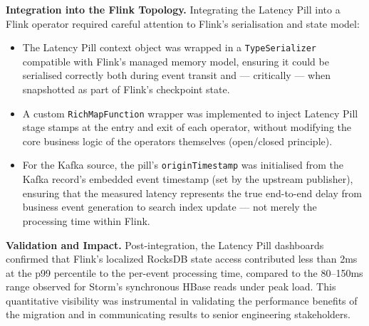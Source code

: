 \begin{justify}
    \textbf{Integration into the Flink Topology.} Integrating the Latency Pill into a Flink operator required careful attention to Flink's serialisation and state model:
    \begin{itemize}
        \item The Latency Pill context object was wrapped in a \texttt{TypeSerializer} compatible with Flink's managed memory model, ensuring it could be serialised correctly both during event transit and — critically — when snapshotted as part of Flink's checkpoint state.
        \item A custom \texttt{RichMapFunction} wrapper was implemented to inject Latency Pill stage stamps at the entry and exit of each operator, without modifying the core business logic of the operators themselves (open/closed principle).
        \item For the Kafka source, the pill's \texttt{originTimestamp} was initialised from the Kafka record's embedded event timestamp (set by the upstream publisher), ensuring that the measured latency represents the true end-to-end delay from business event generation to search index update — not merely the processing time within Flink.
    \end{itemize}

    \textbf{Validation and Impact.} Post-integration, the Latency Pill dashboards confirmed that Flink's localized RocksDB state access contributed less than 2ms at the p99 percentile to the per-event processing time, compared to the 80--150ms range observed for Storm's synchronous HBase reads under peak load. This quantitative visibility was instrumental in validating the performance benefits of the migration and in communicating results to senior engineering stakeholders.
\end{justify}